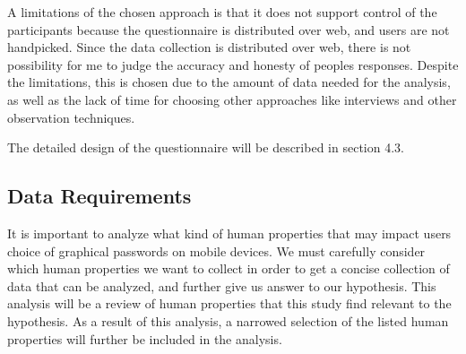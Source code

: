    A limitations of the chosen approach is that it does not support control of the participants because the questionnaire is distributed over web, and users are not handpicked. Since the data collection is distributed over web, there is not possibility for me to judge the accuracy and honesty of peoples responses. Despite the limitations, this is chosen due to the amount of data needed for the analysis, as well as the lack of time for choosing other approaches like interviews and other observation techniques. 

    The detailed design of the questionnaire will be described in section 4.3.

  \subsection{Data Requirements}
  
  It is important to analyze what kind of human properties that may impact users choice of graphical passwords on mobile devices. We must carefully consider which human properties we want to collect in order to get a concise collection of data that can be analyzed, and further give us answer to our hypothesis. This analysis will be a review of human properties that this study find relevant to the hypothesis. As a result of this analysis, a narrowed selection of the listed human properties will further be included in the analysis.  


